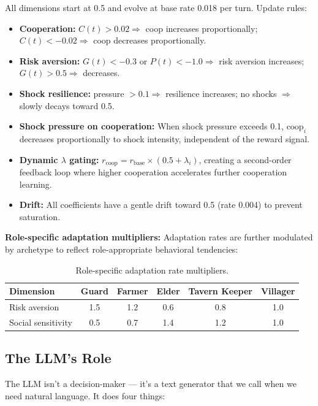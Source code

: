 All dimensions start at 0.5 and evolve at base rate 0.018 per turn. Update rules:
\begin{itemize}
    \item \textbf{Cooperation:} $C(t) > 0.02 \Rightarrow$ coop increases proportionally; $C(t) < -0.02 \Rightarrow$ coop decreases proportionally.
    \item \textbf{Risk aversion:} $G(t) < -0.3$ or $P(t) < -1.0 \Rightarrow$ risk aversion increases; $G(t) > 0.5 \Rightarrow$ decreases.
    \item \textbf{Shock resilience:} pressure $> 0.1 \Rightarrow$ resilience increases; no shocks $\Rightarrow$ slowly decays toward 0.5.
    \item \textbf{Shock pressure on cooperation:} When shock pressure exceeds 0.1, $\text{coop}_i$ decreases proportionally to shock intensity, independent of the reward signal.
    \item \textbf{Dynamic $\lambda$ gating:} $r_{\text{coop}} = r_{\text{base}} \times (0.5 + \lambda_i)$, creating a second-order feedback loop where higher cooperation accelerates further cooperation learning.
    \item \textbf{Drift:} All coefficients have a gentle drift toward 0.5 (rate 0.004) to prevent saturation.
\end{itemize}

\textbf{Role-specific adaptation multipliers:} Adaptation rates are further modulated by archetype to reflect role-appropriate behavioral tendencies:

\begin{table}[ht]
\centering
\caption{Role-specific adaptation rate multipliers.}
\label{tab:role_multipliers}
\begin{tabular}{@{}lccccc@{}}
\toprule
Dimension & Guard & Farmer & Elder & Tavern Keeper & Villager \\
\midrule
Risk aversion & 1.5 & 1.2 & 0.6 & 0.8 & 1.0 \\
Social sensitivity & 0.5 & 0.7 & 1.4 & 1.2 & 1.0 \\
\bottomrule
\end{tabular}
\end{table}

\subsection{The LLM's Role}

The LLM isn't a decision-maker --- it's a text generator that we call when we need natural language. It does four things:

